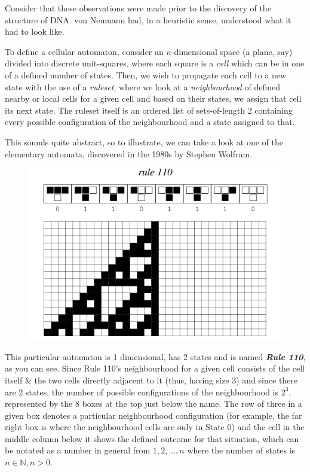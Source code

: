 Consider that these observations were made prior to the discovery of the
structure of DNA. von Neumann had, in a heuristic sense, understood what
it had to look like.

To define a cellular automaton, consider an \(n\)-dimensional space (a
plane, say) divided into discrete unit-squares, where each square is a
\emph{cell} which can be in one of a defined number of states. Then, we
wish to propagate each cell to a new state with the use of a
\emph{ruleset}, where we look at a \emph{neighbourhood} of defined
nearby or local cells for a given cell and based on their states, we
assign that cell its next state. The ruleset itself is an ordered list
of sets-of-length 2 containing every possible configuration of the
neighbourhood and a state assigned to that.

This sounds quite abstract, so to illustrate, we can take a look at one
of the elementary automata, discovered in the 1980s by Stephen Wolfram.

\begin{figure}[htbp]
\centering
\includegraphics{image_0.gif}
\caption{}
\end{figure}

This particular automaton is 1 dimensional, has 2 states and is named
\textbf{\emph{Rule 110}}, as you can see. Since Rule 110's neighbourhood
for a given cell consists of the cell itself \& the two cells directly
adjacent to it (thus, having size 3) and since there are 2 states, the
number of possible configurations of the neighbourhood is \(2^3\),
represented by the 8 boxes at the top just below the name. The row of
three in a given box denotes a particular neighbourhood configuration
(for example, the far right box is where the neighbourhood cells are
only in State 0) and the cell in the middle column below it shows the
defined outcome for that situation, which can be notated as a number in
general from \(1,2,…,n\) where the number of states is
\(n∈\mathbb{N},n>0\).


